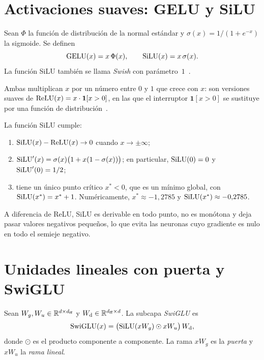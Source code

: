 \section{Activaciones suaves: GELU y SiLU}

\begin{definicion}\label{def:gelu-silu}
Sean $\Phi$ la función de distribución de la normal estándar y $\sigma(x)=1/(1+e^{-x})$ la sigmoide. Se definen
\[
\operatorname{GELU}(x)=x\,\Phi(x),\qquad \operatorname{SiLU}(x)=x\,\sigma(x).
\]
La función SiLU también se llama \emph{Swish} con parámetro~$1$~\cite{shazeer}.
\end{definicion}

Ambas multiplican $x$ por un número entre $0$ y $1$ que crece con $x$: son versiones suaves de $\operatorname{ReLU}(x)=x\cdot\mathbf{1}[x>0]$, en las que el interruptor $\mathbf{1}[x>0]$ se sustituye por una función de distribución~\cite{gelu}.

\begin{proposicion}\label{prop:silu}
La función SiLU cumple:
\begin{enumerate}
  \item $\operatorname{SiLU}(x)-\operatorname{ReLU}(x)\to 0$ cuando $x\to\pm\infty$;
  \item $\operatorname{SiLU}'(x)=\sigma(x)\bigl(1+x(1-\sigma(x))\bigr)$; en particular, $\operatorname{SiLU}(0)=0$ y $\operatorname{SiLU}'(0)=1/2$;
  \item tiene un único punto crítico $x^{*}<0$, que es un mínimo global, con $\operatorname{SiLU}(x^{*})=x^{*}+1$. Numéricamente, $x^{*}\approx-1{,}2785$ y $\operatorname{SiLU}(x^{*})\approx-0{,}2785$.
\end{enumerate}
\end{proposicion}

A diferencia de ReLU, SiLU es derivable en todo punto, no es monótona y deja pasar valores negativos pequeños, lo que evita las neuronas cuyo gradiente es nulo en todo el semieje negativo.

\section{Unidades lineales con puerta y SwiGLU}

\begin{definicion}[SwiGLU]\label{def:swiglu}
Sean $W_g,W_u\in\mathbb{R}^{d\times d_{\mathrm{ff}}}$ y $W_{\mathrm{d}}\in\mathbb{R}^{d_{\mathrm{ff}}\times d}$. La subcapa \emph{SwiGLU} es
\[
\operatorname{SwiGLU}(x)=\bigl(\operatorname{SiLU}(xW_g)\odot xW_u\bigr)\,W_{\mathrm{d}},
\]
donde $\odot$ es el producto componente a componente. La rama $xW_g$ es la \emph{puerta} y $xW_u$ la \emph{rama lineal}.
\end{definicion}

